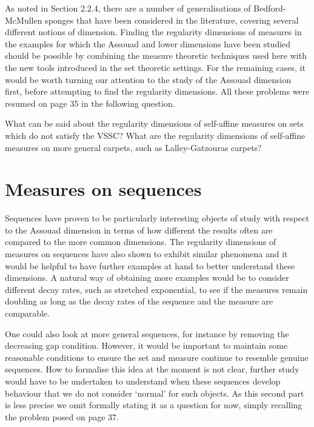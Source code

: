 As noted in Section 2.2.4, there are a number of generalisations of Bedford-McMullen sponges that have been considered in the literature, covering several different notions of dimension. Finding the regularity dimensions of measures in the examples for which the Assouad and lower dimensions have been studied should be possible by combining the measure theoretic techniques used here with the new tools introduced in the set theoretic settings. For the remaining cases, it would be worth turning our attention to the study of the Assouad dimension first, before attempting to find the regularity dimensions. All these problems were resumed on page 35 in the following question.

\begin{question}
What can be said about the regularity dimensions of self-affine measures on sets which do not satisfy the VSSC? What are the regularity dimensions of self-affine measures on more general carpets, such as Lalley-Gatzouras carpets?
\end{question}



\section{Measures on sequences}\label{ch-conclusion:seq}


Sequences have proven to be particularly interesting objects of study with respect to the Assouad dimension in terms of how different the results often are compared to the more common dimensions. The regularity dimensions of measures on sequences have also shown to exhibit similar phenomena and it would be helpful to have further examples at hand to better understand these dimensions. A natural way of obtaining more examples would be to consider different decay rates, such as stretched exponential, to see if the measures remain doubling as long as the decay rates of the sequence and the measure are comparable. 

One could also look at more general sequences, for instance by removing the decreasing gap condition. However, it would be important to maintain some reasonable conditions to ensure the set and measure continue to resemble genuine sequences. How to formalise this idea at the moment is not clear, further study would have to be undertaken to understand when these sequences develop behaviour that we do not consider `normal' for such objects. As this second part is less precise we omit formally stating it as a question for now, simply recalling the problem posed on page 37.

